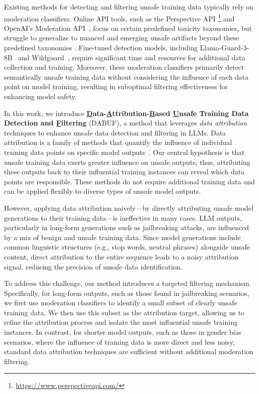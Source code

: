 \documentclass[11pt]{article}
\begin{document}
Existing methods for detecting and filtering unsafe training data typically rely on moderation classifiers. Online API tools, such as the Perspective API \footnote{\url{https://www.perspectiveapi.com/}} and OpenAI's Moderation API~\citep{markov2023holisticapproachundesiredcontent}, focus on certain predefined toxicity taxonomies, but struggle to generalize to nuanced and emerging unsafe artifacts beyond these predefined taxonomies \cite{weber2025digitalguardiansgpt4perspective}. Fine-tuned detection models, including Llama-Guard-3-8B~\citep{dubey2024llama3herdmodels} and Wildguard~\citep{han2024wildguardopenonestopmoderation}, require significant time and resources for additional data collection and training. Moreover, these moderation classifiers primarily detect semantically unsafe training data without considering the influence of each data point on model training, resulting in suboptimal filtering effectiveness for enhancing model safety.

In this work, we introduce \textbf{\underline{D}ata-\underline{A}ttribution-\underline{B}ased \underline{U}nsafe Training Data Detection and \underline{F}iltering} (DABUF), a method that leverages \textit{data attribution} techniques to enhance unsafe data detection and filtering in LLMs. Data attribution is a family of methods that quantify the influence of individual training data points on specific model outputs~\citep{koh2020understandingblackboxpredictionsinfluence,pruthi2020estimatingtrainingdatainfluence}. Our central hypothesis is that unsafe training data exerts greater influence on unsafe outputs; thus, attributing these outputs back to their influential training instances can reveal which data points are responsible. These methods do not require additional training data and can be applied flexibly to diverse types of unsafe model outputs.

However, applying data attribution naively—by directly attributing unsafe model generations to their training data—is ineffective in many cases. LLM outputs, particularly in long-form generations such as jailbreaking attacks, are influenced by a mix of benign and unsafe training data. Since model generations include common linguistic structures (e.g., stop words, neutral phrases) alongside unsafe content, direct attribution to the entire sequence leads to a noisy attribution signal, reducing the precision of unsafe data identification.

To address this challenge, our method introduces a targeted filtering mechanism. Specifically, for long-form outputs, such as those found in jailbreaking scenarios, we first use moderation classifiers to identify a small subset of clearly unsafe training data. We then use this subset as the attribution target, allowing us to refine the attribution process and isolate the most influential unsafe training instances. In contrast, for shorter model outputs, such as those in gender bias scenarios, where the influence of training data is more direct and less noisy, standard data attribution techniques are sufficient without additional moderation filtering.
\end{document}
